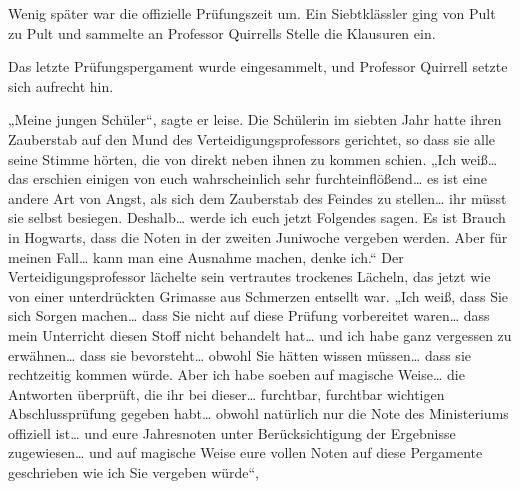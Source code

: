 Wenig später war die offizielle Prüfungszeit um. Ein Siebtklässler ging von Pult zu Pult und sammelte an Professor Quirrells Stelle die Klausuren ein.

Das letzte Prüfungspergament wurde eingesammelt, und Professor Quirrell setzte sich aufrecht hin.

„Meine jungen Schüler“, sagte er leise.
Die Schülerin im siebten Jahr hatte ihren Zauberstab auf den Mund des Verteidigungsprofessors gerichtet, so dass sie alle seine Stimme hörten, die von direkt neben ihnen zu kommen schien.
„Ich weiß… das erschien einigen von euch wahrscheinlich sehr furchteinflößend… es ist eine andere Art von Angst, als sich dem Zauberstab des Feindes zu stellen… ihr müsst sie selbst besiegen. Deshalb… werde ich euch jetzt Folgendes sagen. Es ist Brauch in Hogwarts, dass die Noten in der zweiten Juniwoche vergeben werden. Aber für meinen Fall… kann man eine Ausnahme machen, denke ich.“
Der Verteidigungsprofessor lächelte sein vertrautes trockenes Lächeln, das jetzt wie von einer unterdrückten Grimasse aus Schmerzen entsellt war.
„Ich weiß, dass Sie sich Sorgen machen… dass Sie nicht auf diese Prüfung vorbereitet waren… dass mein Unterricht diesen Stoff nicht behandelt hat… und ich habe ganz vergessen zu erwähnen… dass sie bevorsteht… obwohl Sie hätten wissen müssen… dass sie rechtzeitig kommen würde. Aber ich habe soeben auf magische Weise… die Antworten überprüft, die ihr bei dieser… furchtbar, furchtbar wichtigen Abschlussprüfung gegeben habt… obwohl natürlich nur die Note des Ministeriums offiziell ist… und eure Jahresnoten unter Berücksichtigung der Ergebnisse zugewiesen… und auf magische Weise eure vollen Noten auf diese Pergamente geschrieben wie ich Sie vergeben würde“,
